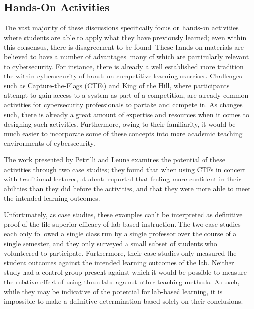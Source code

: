 \documentclass{article}
\begin{document}
\subsection{Hands-On Activities}

    The vast majority of these discussions specifically focus on hands-on activities where students are able to apply what they have previously learned; even within this consensus, there is disagreement to be found. These hands-on materials are believed to have a number of advantages, many of which are particularly relevant to cybersecurity. For instance, there is already a well established more tradition the within cybersecurity of hands-on competitive learning exercises. Challenges such as Capture-the-Flags (CTFs) and King of the Hill, where participants attempt to gain access to a system as part of a competition, are already common activities for cybersecurity professionals to partake and compete in. As changes such, there is already a great amount of expertise and resources when it comes to designing such activities. Furthermore, owing to their familiarity, it would be much easier to incorporate some of these concepts into more academic teaching environments of cybersecurity.

    The work presented by Petrilli and Leune examines the potential of these activities through two case studies; they found that when using CTFs in concert with traditional lectures, students reported that feeling more confident in their abilities than they did before the activities, and that they were more able to meet the intended learning outcomes. 

    Unfortunately, as case studies, these examples can’t be interpreted as definitive proof of the file superior efficacy of lab-based instruction. 
    The two case studies each only followed a single class run by a single professor over the course of a single semester, and they only surveyed a small subset of students who volunteered to participate. Furthermore, their case studies only measured the student outcomes against the intended learning outcomes of the lab. Neither study had a control group present against which it would be possible to measure the relative effect of using these labs against other teaching methods. As such, while they may be indicative of the potential for lab-based learning, it is impossible to make a definitive determination based solely on their conclusions.
\end{document}
